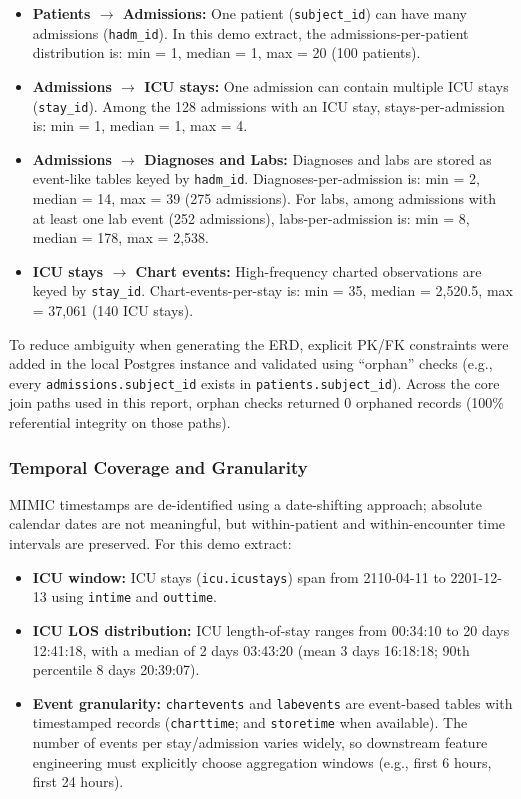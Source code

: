 \documentclass[12pt]{article}
\begin{document}
\begin{itemize}
  \item \textbf{Patients $\rightarrow$ Admissions:} One patient (\texttt{subject\_id}) can have many admissions (\texttt{hadm\_id}). In this demo extract, the admissions-per-patient distribution is: min = 1, median = 1, max = 20 (100 patients).
  \item \textbf{Admissions $\rightarrow$ ICU stays:} One admission can contain multiple ICU stays (\texttt{stay\_id}). Among the 128 admissions with an ICU stay, stays-per-admission is: min = 1, median = 1, max = 4.
  \item \textbf{Admissions $\rightarrow$ Diagnoses and Labs:} Diagnoses and labs are stored as event-like tables keyed by \texttt{hadm\_id}. Diagnoses-per-admission is: min = 2, median = 14, max = 39 (275 admissions). For labs, among admissions with at least one lab event (252 admissions), labs-per-admission is: min = 8, median = 178, max = 2{,}538.
  \item \textbf{ICU stays $\rightarrow$ Chart events:} High-frequency charted observations are keyed by \texttt{stay\_id}. Chart-events-per-stay is: min = 35, median = 2{,}520.5, max = 37{,}061 (140 ICU stays).

\end{itemize}


To reduce ambiguity when generating the ERD, explicit PK/FK constraints were added in the local Postgres instance and validated using ``orphan'' checks (e.g., every \texttt{admissions.subject\_id} exists in \texttt{patients.subject\_id}). Across the core join paths used in this report, orphan checks returned 0 orphaned records
(100\% referential integrity on those paths).




\subsubsection{Temporal Coverage and Granularity}

MIMIC timestamps are de-identified using a date-shifting approach; absolute calendar dates are not meaningful, but within-patient and within-encounter time intervals are preserved. For this demo extract:


\begin{itemize}
  \item \textbf{ICU window:} ICU stays (\texttt{icu.icustays}) span from 2110-04-11 to 2201-12-13 using \texttt{intime} and \texttt{outtime}.
  \item \textbf{ICU LOS distribution:} ICU length-of-stay ranges from 00:34:10 to 20 days 12:41:18, with a median of 2 days 03:43:20 (mean 3 days 16:18:18; 90th percentile 8 days 20:39:07).
  \item \textbf{Event granularity:} \texttt{chartevents} and \texttt{labevents} are event-based tables with timestamped records (\texttt{charttime}; and \texttt{storetime} when available). The number of events per stay/admission varies widely, so downstream feature engineering must explicitly choose aggregation windows (e.g., first 6 hours, first 24 hours).

\end{itemize}
\end{document}
